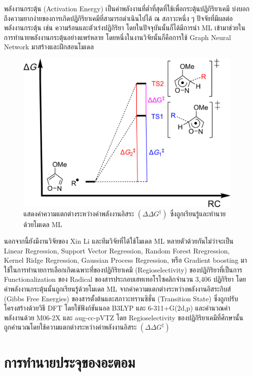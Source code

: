 พลังงานกระตุ้น (Activation Energy) เป็นค่าพลังงานที่ต่ำที่สุดที่ใช้เพื่อกระตุ้นปฏิกิริยาเคมี บ่งบอกถึงความยากง่ายของการเกิดปฏิกิริยาเคมีที่สามารถดำเนินไปได้ ณ สภาวะหนึ่ง ๆ ปัจจัยที่มีผลต่อพลังงานกระตุ้น เช่น ความร้อนและตัวเร่งปฏิกิริยา โดยในปัจจุบันนั้นก็ได้มีการนำ ML เข้ามาช่วยในการทำนายพลังงานกระตุ้นอย่างแพร่หลาย\autocite{lewis-atwell2022} โดยหนึ่งในงานวิจัยนั้นก็คือการใช้ Graph Neural Network มาสร้างและฝึกสอนโมเดล\autocite{grambow2020}

\begin{figure}[H]
    \centering
    \includegraphics[width=0.6\linewidth]{fig/ml_act_energy_regio.jpg}
    \caption{แสดงค่าความแตกต่างระหว่างค่าพลังงานอิสระ $(\Delta\Delta G^{\ddagger})$ ซึ่งถูกเรียนรู้และทำนายด้วยโมเดล ML}
    \label{fig:ml_act_energy_regio}
\end{figure}

นอกจากนี้ยังมีงานวิจัยของ Xin Li และทีมวิจัยที่ได้ใช้โมเดล ML หลายตัวด้วยกันไม่ว่าจะเป็น Linear Regression, Support Vector Regression, Random Forest Rregression, Kernel Ridge Regression, Gaussian Process Regression, หรือ Gradient boosting มาใช้ในการทำนายการเลือกเกิดเฉพาะที่ของปฏิกิริยาเคมี (Regioselectivity) ของปฏิกิริยาที่เป็นการ Functionalization ของ  Radical ของสารประกอบเฮทเทอโรไซคลิกจำนวน 3,406 ปฏิกิริยา\autocite{li2020} โดยค่าพลังงานกระตุ้นนั้นถูกเรียนรู้ด้วยโมเดล ML จากค่าความแตกต่างระหว่างพลังงานอิสระกิบส์ (Gibbs Free Energies) ของสารตั้งต้นและสภาวะทรานซิชั่น (Transition State) ซึ่งถูกปรับโครงสร้างด้วยวิธี DFT โดยใช้ฟังก์ชันนอล B3LYP และ 6-311+G(2d,p) และคำนวณค่าพลังงานด้วย M06-2X และ aug-cc-pVTZ โดย Regioselectivity ของปฏิกิริยาเคมีที่ศึกษานั้นถูกคำนวณโดยใช้ความแตกต่างระหว่างค่าพลังงานอิสระ $(\Delta\Delta G^{\ddagger})$

\section{การทำนายประจุของอะตอม}
\label{sec:pred_atomic_charge}

